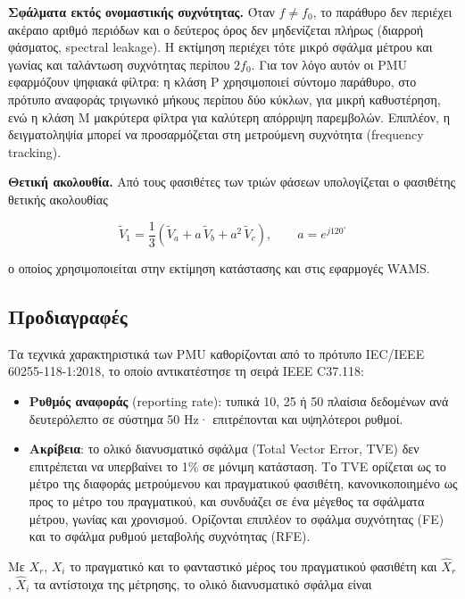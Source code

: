 \textbf{Σφάλματα εκτός ονομαστικής συχνότητας.} Όταν $f \neq f_0$, το παράθυρο δεν περιέχει
ακέραιο αριθμό περιόδων και ο δεύτερος όρος δεν μηδενίζεται πλήρως (διαρροή φάσματος,
spectral leakage). Η εκτίμηση περιέχει τότε μικρό σφάλμα μέτρου και γωνίας και ταλάντωση
συχνότητας περίπου $2f_0$. Για τον λόγο αυτόν οι PMU εφαρμόζουν ψηφιακά φίλτρα: η κλάση P
χρησιμοποιεί σύντομο παράθυρο, στο πρότυπο αναφοράς τριγωνικό μήκους περίπου δύο κύκλων, για
μικρή καθυστέρηση, ενώ η κλάση M μακρύτερα φίλτρα για καλύτερη απόρριψη παρεμβολών.
Επιπλέον, η δειγματοληψία μπορεί να προσαρμόζεται στη μετρούμενη συχνότητα (frequency
tracking).

\textbf{Θετική ακολουθία.} Από τους φασιθέτες των τριών φάσεων υπολογίζεται ο φασιθέτης θετικής
ακολουθίας

\begin{equation}
\tilde{V}_1 = \frac{1}{3}\left(\tilde{V}_a + a\,\tilde{V}_b + a^2\,\tilde{V}_c\right),
\qquad a = e^{j120^\circ}
\label{eq:posseq}
\end{equation}

ο οποίος χρησιμοποιείται στην εκτίμηση κατάστασης και στις εφαρμογές WAMS.


\subsection{Προδιαγραφές}

Τα τεχνικά χαρακτηριστικά των PMU καθορίζονται από το πρότυπο IEC/IEEE 60255-118-1:2018, το
οποίο αντικατέστησε τη σειρά IEEE C37.118:

\begin{itemize}
\item \textbf{Ρυθμός αναφοράς} (reporting rate): τυπικά 10, 25 ή 50 πλαίσια δεδομένων ανά
      δευτερόλεπτο σε σύστημα 50 Hz· επιτρέπονται και υψηλότεροι ρυθμοί.
\item \textbf{Ακρίβεια}: το ολικό διανυσματικό σφάλμα (Total Vector Error, TVE) δεν
      επιτρέπεται να υπερβαίνει το 1\% σε μόνιμη κατάσταση. Το TVE ορίζεται ως το μέτρο της
      διαφοράς μετρούμενου και πραγματικού φασιθέτη, κανονικοποιημένο ως προς το μέτρο του
      πραγματικού, και συνδυάζει σε ένα μέγεθος τα σφάλματα μέτρου, γωνίας και χρονισμού.
      Ορίζονται επιπλέον το σφάλμα συχνότητας (FE) και το σφάλμα ρυθμού μεταβολής
      συχνότητας (RFE).
\end{itemize}

Με $X_r$, $X_i$ το πραγματικό και το φανταστικό μέρος του πραγματικού φασιθέτη και
$\hat{X}_r$, $\hat{X}_i$ τα αντίστοιχα της μέτρησης, το ολικό διανυσματικό σφάλμα είναι

